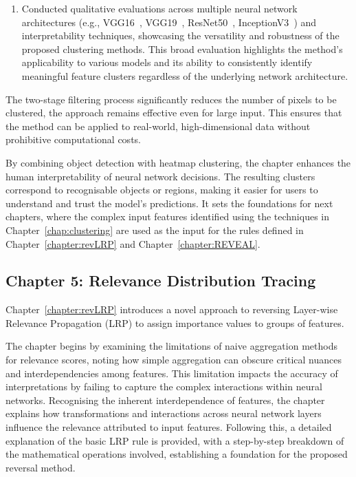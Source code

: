\begin{enumerate}
\item Conducted qualitative evaluations across multiple neural network architectures (e.g., VGG16~\cite{SimonyanZ14a}, VGG19~\cite{SimonyanZ14a}, ResNet50~\cite{he2015deep}, InceptionV3~\cite{szegedy2015rethinking}) and interpretability techniques, showcasing the versatility and robustness of the proposed clustering methods. This broad evaluation highlights the method's applicability to various models and its ability to consistently identify meaningful feature clusters regardless of the underlying network architecture.
\end{enumerate}

The two-stage filtering process significantly reduces the number of pixels to be clustered, the approach remains effective even for large input. This ensures that the method can be applied to real-world, high-dimensional data without prohibitive computational costs.

By combining object detection with heatmap clustering, the chapter enhances the human interpretability of neural network decisions. The resulting clusters correspond to recognisable objects or regions, making it easier for users to understand and trust the model's predictions. It sets the foundations for next chapters, where the complex input features identified using the techniques in Chapter~\ref{chap:clustering} are used as the input for the rules defined in Chapter~\ref{chapter:revLRP} and Chapter~\ref{chapter:REVEAL}.

\subsection{Chapter 5: Relevance Distribution Tracing}

Chapter~\ref{chapter:revLRP} introduces a novel approach to reversing Layer-wise Relevance Propagation (LRP) to assign importance values to groups of features.

The chapter begins by examining the limitations of naive aggregation methods for relevance scores, noting how simple aggregation can obscure critical nuances and interdependencies among features. This limitation impacts the accuracy of interpretations by failing to capture the complex interactions within neural networks. Recognising the inherent interdependence of features, the chapter explains how transformations and interactions across neural network layers influence the relevance attributed to input features. Following this, a detailed explanation of the basic LRP rule is provided, with a step-by-step breakdown of the mathematical operations involved, establishing a foundation for the proposed reversal method.

